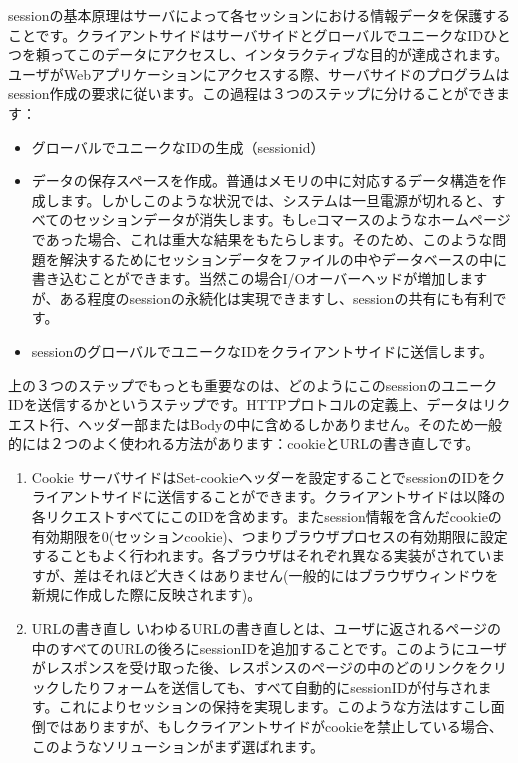sessionの基本原理はサーバによって各セッションにおける情報データを保護することです。クライアントサイドはサーバサイドとグローバルでユニークなIDひとつを頼ってこのデータにアクセスし、インタラクティブな目的が達成されます。ユーザがWebアプリケーションにアクセスする際、サーバサイドのプログラムはsession作成の要求に従います。この過程は３つのステップに分けることができます：

\begin{itemize}
  \item グローバルでユニークなIDの生成（sessionid）
  \item データの保存スペースを作成。普通はメモリの中に対応するデータ構造を作成します。しかしこのような状況では、システムは一旦電源が切れると、すべてのセッションデータが消失します。もしeコマースのようなホームページであった場合、これは重大な結果をもたらします。そのため、このような問題を解決するためにセッションデータをファイルの中やデータベースの中に書き込むことができます。当然この場合I/Oオーバーヘッドが増加しますが、ある程度のsessionの永続化は実現できますし、sessionの共有にも有利です。
  \item sessionのグローバルでユニークなIDをクライアントサイドに送信します。
\end{itemize}

上の３つのステップでもっとも重要なのは、どのようにこのsessionのユニークIDを送信するかというステップです。HTTPプロトコルの定義上、データはリクエスト行、ヘッダー部またはBodyの中に含めるしかありません。そのため一般的には２つのよく使われる方法があります：cookieとURLの書き直しです。

\begin{enumerate}
  \item Cookie サーバサイドはSet-cookieヘッダーを設定することでsessionのIDをクライアントサイドに送信することができます。クライアントサイドは以降の各リクエストすべてにこのIDを含めます。またsession情報を含んだcookieの有効期限を0(セッションcookie)、つまりブラウザプロセスの有効期限に設定することもよく行われます。各ブラウザはそれぞれ異なる実装がされていますが、差はそれほど大きくはありません(一般的にはブラウザウィンドウを新規に作成した際に反映されます)。
  \item URLの書き直し いわゆるURLの書き直しとは、ユーザに返されるページの中のすべてのURLの後ろにsessionIDを追加することです。このようにユーザがレスポンスを受け取った後、レスポンスのページの中のどのリンクをクリックしたりフォームを送信しても、すべて自動的にsessionIDが付与されます。これによりセッションの保持を実現します。このような方法はすこし面倒ではありますが、もしクライアントサイドがcookieを禁止している場合、このようなソリューションがまず選ばれます。
\end{enumerate}



